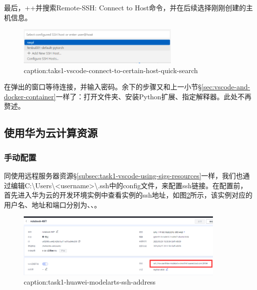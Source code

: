 最后，++并搜索Remote-SSH: Connect to Host命令，并在后续选择刚刚创建的主机信息。

\begin{figure}[htbp]
	\centering
	\includegraphics[width=0.7\textwidth]{figures/taks1-vscode-connect-to-certain-host-quick-search.png}
	\caption{caption:taks1-vscode-connect-to-certain-host-quick-search}
	\label{fig:taks1-vscode-connect-to-certain-host-quick-search}
\end{figure}

在弹出的窗口等待连接，并输入密码。余下的步骤又和上一小节\S\ref{sec:vscode-and-docker-container}一样了：打开文件夹、安装Python扩展、指定解释器。此处不再赘述。

\subsection{使用华为云计算资源}

\subsubsection{手动配置}

同使用远程服务器资源\S\ref{subsec:task1-vscode-using-sigs-resources}一样，我们也通过编辑C:\textbackslash Users\textbackslash <username>\textbackslash .ssh中的config文件，来配置ssh链接。在配置前，首先进入华为云的开发环境实例中查看实例的ssh地址，如图\ref{fig:task1-huawei-modelarts-ssh-address}所示，该实例对应的用户名、地址和端口分别为、、。

\begin{figure}[htbp]
	\centering
	\includegraphics[width=0.9\textwidth]{figures/task1-huawei-modelarts-ssh-address.png}
	\caption{caption:task1-huawei-modelarts-ssh-address}
	\label{fig:task1-huawei-modelarts-ssh-address}
\end{figure}


